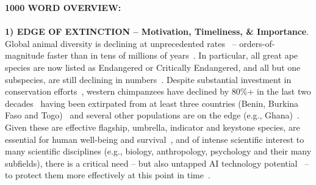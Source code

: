 \documentclass{article}
\newcommand{\tb}[1]{\textcolor[rgb]{0,0,0.5}{#1}}
\begin{document}
\textbf{\tb{1000 WORD OVERVIEW:}}\\ \ \\
\tb{\textbf{1) EDGE OF EXTINCTION -- Motivation, Timeliness, \& Importance}.\\
Global animal diversity is declining at unprecedented rates~\cite{Tuia2022} -- orders-of-magnitude faster than in tens of millions of years~\cite{Ceballos2020}. In particular, all great ape species are now listed as Endangered or Critically Endangered, and all but one subspecies, are still declining in numbers~\cite{Hockings2015}. Despite substantial investment in conservation efforts~\cite{Bettinger2021}, western chimpanzees have declined by 80\%+ in the last two decades~\cite{Kuhl2017} having been extirpated from at least three countries (Benin, Burkina Faso and Togo)~\cite{Ginn2013,Campbell2015} and several other populations are on the edge (e.g., Ghana)~\cite{Kuhl2017}. Given these are effective flagship, umbrella, indicator and keystone species, are essential for human well-being and survival~\cite{MEA2005}, and of intense scientific interest to many scientific disciplines (e.g., biology, anthropology, psychology and their many subfields), there is a critical need -- but also untapped AI technology potential~\cite{Tuia2022} -- to protect them more effectively at this point in time~\cite{Paine1969,Tutin1991,Clucas2008}.}\\ 
\end{document}
